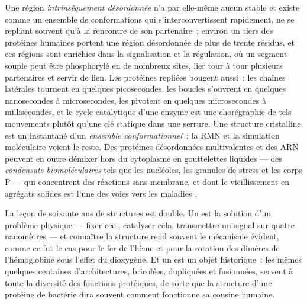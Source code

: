 \begin{definition}\label{def:b3:structural-biology:disorder}
Une région \emph{intrinsèquement désordonnée} n'a par elle-même aucun
 stable et existe comme un ensemble de conformations qui
s'interconvertissent rapidement, ne se repliant souvent qu'à la
rencontre de son partenaire~; environ un tiers des protéines humaines
portent une région désordonnée de plus de trente résidus, et ces
régions sont enrichies dans la signalisation et la régulation, où un
segment souple peut être phosphorylé en de nombreux sites, lier tour à
tour plusieurs partenaires et servir de lien. Les protéines repliées
bougent aussi~: les chaînes latérales tournent en quelques
picosecondes, les boucles s'ouvrent en quelques nanosecondes à
microsecondes, les  pivotent en quelques microsecondes à
millisecondes, et le cycle catalytique d'une enzyme est une
chorégraphie de tels mouvements plutôt qu'une clé statique dans une
serrure. Une structure cristalline est un instantané d'un
\emph{ensemble conformationnel}~; la RMN et la simulation moléculaire
voient le reste. Des protéines désordonnées multivalentes et des ARN
peuvent en outre démixer hors du cytoplasme en gouttelettes liquides
--- des \emph{condensats biomoléculaires} tels que les nucléoles, les
granules de stress et les corps P --- qui concentrent des réactions
sans membrane, et dont le vieillissement en agrégats solides est l'une
des voies vers les maladies .
\end{definition}

\begin{remark}\label{rem:b3:structural-biology:sf}
La leçon de soixante ans de structures est double. Un  est la
solution d'un problème physique --- fixer ceci, catalyser cela,
transmettre un signal sur quatre nanomètres --- et connaître la
structure rend souvent le mécanisme évident, comme ce fut le cas pour
le fer de l'hème et pour la rotation des dimères de l'hémoglobine sous
l'effet du dioxygène. Et un  est un objet historique~: les
mêmes quelques centaines d'architectures, bricolées, dupliquées et
fusionnées, servent à toute la diversité des fonctions protéiques, de
sorte que la structure d'une protéine de bactérie dira souvent comment
fonctionne sa cousine humaine.
\end{remark}

